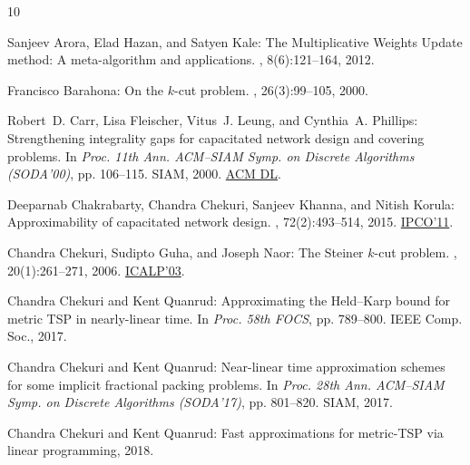 \documentclass[11pt]{article}
\numberwithin{equation}{section}
\theoremstyle{definition}
\theoremstyle{plain}
\begin{document}
\tocrefpdfbookmark
\begin{thebibliography}{10}

{\sc Sanjeev Arora, Elad Hazan, and Satyen Kale}: The {M}ultiplicative
  {W}eights {U}pdate method: {A} meta-algorithm and applications.
, 8(6):121--164, 2012.

{\sc Francisco Barahona}: On the $k$-cut problem.
, 26(3):99--105, 2000.
\newblock [\epfmtdoi{10.1016/S0167-6377(99)00071-1}]

{\sc Robert~D. Carr, Lisa Fleischer, Vitus~J. Leung, and Cynthia~A. Phillips}:
  Strengthening integrality gaps for capacitated network design and covering
  problems.
\newblock In {\em Proc. 11th Ann. ACM--SIAM Symp. on Discrete Algorithms
  (SODA'00)}, pp. 106--115. SIAM, 2000.
\newblock \href{https://dl.acm.org/doi/abs/10.5555/338219.338241}{ACM DL}.

{\sc Deeparnab Chakrabarty, Chandra Chekuri, Sanjeev Khanna, and Nitish
  Korula}: Approximability of capacitated network design.
, 72(2):493--514, 2015.
\newblock \prelim \href{https://doi.org/10.1007/978-3-642-20807-2_7}{IPCO'11}.

{\sc Chandra Chekuri, Sudipto Guha, and Joseph Naor}: The {Steiner} $k$-cut
  problem.
, 20(1):261--271, 2006.
\newblock \prelim \href{https://doi.org/10.1007/3-540-45061-0\_17}{ICALP'03}.
\newblock [\epfmtdoi{10.1137/S0895480104445095}]

{\sc Chandra Chekuri and Kent Quanrud}: Approximating the {Held}--{Karp} bound
  for metric {TSP} in nearly-linear time.
\newblock In {\em Proc. 58th FOCS}, pp. 789--800. IEEE Comp. Soc., 2017.

{\sc Chandra Chekuri and Kent Quanrud}: Near-linear time approximation schemes
  for some implicit fractional packing problems.
\newblock In {\em Proc. 28th Ann. ACM--SIAM Symp. on Discrete Algorithms
  (SODA'17)}, pp. 801--820. SIAM, 2017.
\newblock [\epfmtdoi{10.1137/1.9781611974782.51}]

{\sc Chandra Chekuri and Kent Quanrud}: Fast approximations for metric-{TSP}
  via linear programming, 2018.


\end{thebibliography}
\end{document}
